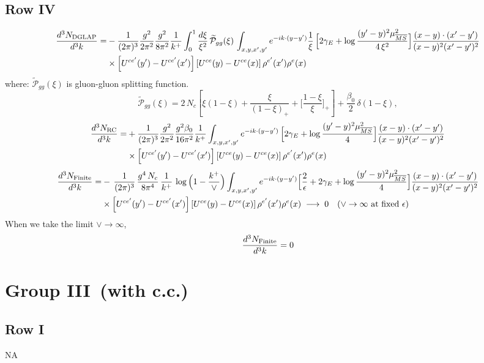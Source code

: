 \documentclass[9pt]{article}
\numberwithin{equation}{section}
\begin{document}
\subsection{Row IV}
\begin{align}
\frac{d^{3}N_{\rm DGLAP}}{d^{3}k}= &-\frac{1}{(2\pi)^{3}}\frac{g^{2}}{2\pi^{2}}\frac{g^{2}}{8\pi^{2}}\frac{1}{k^{+}}\int_{0}^{1}\frac{d\xi}{\xi^{2}}\,\widetilde{\mathcal P}_{gg}(\xi)\,\int_{x,y,x',y'}e^{-ik\cdot(y-y')}\frac{1}{\xi}\,\Big[2\gamma_{E}+\log\frac{(y'-y)^{2}\mu^{2}_{\overline{MS}}}{4\,\xi^{2}}\Big]\frac{(x-y)\cdot(x'-y')}{(x-y)^{2}(x'-y')^{2}}\notag\\
&\times\left[U^{ce'}(y') - U^{ce'}(x')\right]\left[U^{ce}(y) - U^{ce}(x)\right]\rho^{e'}(x')\rho^{e}(x)
\end{align}
where:
$\widetilde{\mathcal{P}}_{gg}(\xi)$ is gluon-gluon splitting function.
$$\widetilde{\mathcal{P}}_{gg}(\xi) = 2\,N_{c}\left[\xi(1-\xi) + \frac{\xi}{(1-\xi)_{+}} + \Big[\frac{1-\xi}{\xi}\Big]_{+}\right]+\frac{\beta_{0}}{2}\,\delta(1-\xi),$$ 
\begin{align}
\frac{d^{3}N_{\rm RC}}{d^{3}k}= & +\frac{1}{(2\pi)^{3}}\frac{g^{2}}{2\pi^{2}}\frac{g^{2}\beta_{0}}{16\pi^{2}}\frac{1}{k^{+}}\int_{x,y,x',y'}e^{-ik\cdot(y-y')}\,\Big[2\gamma_{E}+\log\frac{(y'-y)^{2}\mu^{2}_{\overline{MS}}}{4}\Big]\frac{(x-y)\cdot(x'-y')}{(x-y)^{2}(x'-y')^{2}}\notag\\
&\times\left[U^{ce'}(y') - U^{ce'}(x')\right]\left[U^{ce}(y) - U^{ce}(x)\right]\rho^{e'}(x')\rho^{e}(x)
\end{align}
\begin{align} \frac{d^{3}N_{\rm Finite}}{d^{3}k}= & -\,\frac{1}{(2\pi)^{3}}\,\frac{g^{4}\,N_{c}}{8\pi^{4}}\,\frac{1}{k^{+}}\,\log\Big(1-\frac{k^{+}}{\vee}\Big)\int_{x,y,x',y'}e^{-ik\cdot(y-y')}\Big[\frac{2}{\epsilon}+2\gamma_{E}+\log\frac{(y'-y)^{2}\mu^{2}_{\overline{MS}}}{4}\Big]\frac{(x-y)\cdot(x'-y')}{(x-y)^{2}(x'-y')^{2}}\notag \\ & \times\left[U^{ce'}(y') - U^{ce'}(x')\right]\left[U^{ce}(y) - U^{ce}(x)\right]\rho^{e'}(x')\rho^{e}(x)\;\longrightarrow\;0\quad(\vee\to\infty\ \text{at fixed }\epsilon)
\end{align} 
When we take the limit $\vee\to \infty$, 
$$\frac{d^{3}N_{\rm Finite}}{d^{3}k} = 0$$
\section{Group III\, (with c.c.)}
\subsection{Row I}
\textsc{NA}
\end{document}
